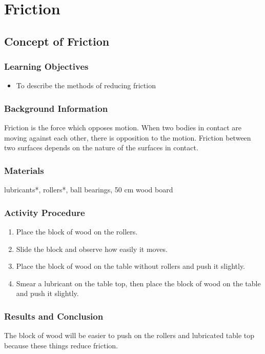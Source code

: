 \section{Friction}

\subsection{Concept of Friction}

\subsubsection*{Learning Objectives}
\begin{itemize}
\item{To describe the methods of reducing friction} 
\end{itemize}

\subsubsection*{Background Information}
Friction is the force which opposes motion.  When two bodies in contact are moving against each other, there is opposition to the motion.  Friction between two surfaces depends on the nature of the surfaces in contact.

\subsubsection*{Materials}
lubricants*, rollers*, ball bearings, 50 cm wood board

\subsubsection*{Activity Procedure}
\begin{enumerate}
\item{Place the block of wood on the rollers.} 
\item{Slide the block and observe how easily it moves.} 
\item{Place the block of wood on the table without rollers and push it slightly.} 
\item{Smear a lubricant on the table top, then place the block of wood on the table and push it slightly.} 
\end{enumerate}

\subsubsection*{Results and Conclusion}
The block of wood will be easier to push on the rollers and lubricated table top because these things reduce friction.  

